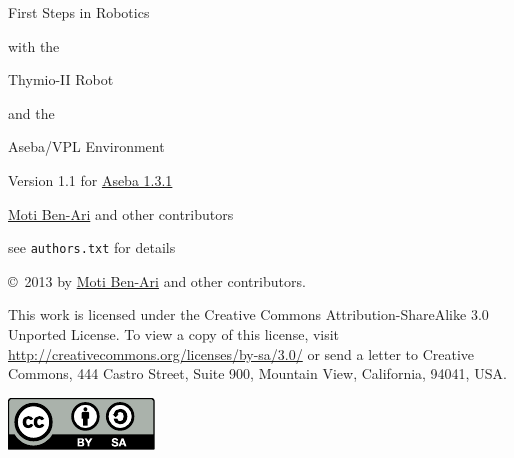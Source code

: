 \thispagestyle{empty}

\begin{center}
\begin{LARGE}
\begin{bfseries}
First Steps in Robotics

with the

Thymio-II Robot

and the

Aseba/VPL Environment
\end{bfseries}
\end{LARGE}

\begin{Large}
Version 1.1 for \href{https://aseba.wikidot.com/en:downloadinstall}{Aseba 1.3.1}
\end{Large}

\bigskip\bigskip

\begin{LARGE}
\href{http://www.weizmann.ac.il/sci-tea/benari/}{Moti Ben-Ari} and other contributors\\
\end{LARGE}
\bigskip
\begin{Large}
see \texttt{authors.txt} for details
\end{Large}

\bigskip


\end{center}

\vfill

\begin{center}
\copyright{}\  2013 by \href{http://www.weizmann.ac.il/sci-tea/benari/}{Moti Ben-Ari} and other contributors.
\end{center}

This work is licensed under the Creative Commons
Attribution-ShareAlike 3.0 Unported License. To view a copy
of this license, visit
\url{http://creativecommons.org/licenses/by-sa/3.0/}
or send a letter to Creative Commons, 444 Castro Street, Suite 900,
Mountain View, California, 94041, USA.

\begin{center}
\includegraphics[width=.2\textwidth]{../images/by-sa}
\end{center}

\tableofcontents
\thispagestyle{empty}
